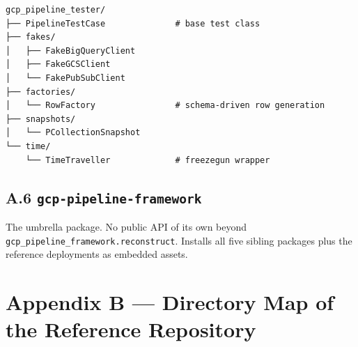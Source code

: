 \documentclass[
  11pt,
  british,
  oneside]{book}
\begin{document}
\begin{verbatim}
gcp_pipeline_tester/
├── PipelineTestCase              # base test class
├── fakes/
│   ├── FakeBigQueryClient
│   ├── FakeGCSClient
│   └── FakePubSubClient
├── factories/
│   └── RowFactory                # schema-driven row generation
├── snapshots/
│   └── PCollectionSnapshot
└── time/
    └── TimeTraveller             # freezegun wrapper
\end{verbatim}

\hypertarget{a.6-gcp-pipeline-framework}{%
\section{\texorpdfstring{A.6
\texttt{gcp-pipeline-framework}}{A.6 gcp-pipeline-framework}}\label{a.6-gcp-pipeline-framework}}

The umbrella package. No public API of its own beyond
\texttt{gcp\_pipeline\_framework.reconstruct}. Installs all five sibling
packages plus the reference deployments as embedded assets.

\newpage

\hypertarget{appendix-b-directory-map-of-the-reference-repository}{%
\chapter{Appendix B --- Directory Map of the Reference
Repository}\label{appendix-b-directory-map-of-the-reference-repository}}
\end{document}
